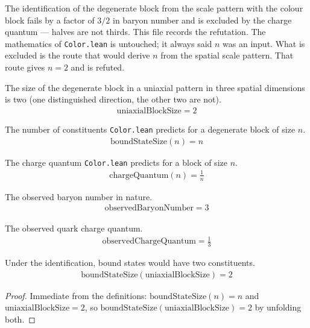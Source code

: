 The identification of the degenerate block from the scale pattern with the colour block fails by a factor of $3/2$ in baryon number and is excluded by the charge quantum — halves are not thirds.  This file records the refutation.  The mathematics of \texttt{Color.lean} is untouched; it always said $n$ was an input.  What is excluded is the route that would derive $n$ from the spatial scale pattern.  That route gives $n = 2$ and is refuted.

\begin{definition}
The size of the degenerate block in a uniaxial pattern in three spatial dimensions is two (one distinguished direction, the other two are not).
\begin{align*}
\text{uniaxialBlockSize} = 2
\end{align*}
\end{definition}

\begin{definition}
The number of constituents \texttt{Color.lean} predicts for a degenerate block of size $n$.
\begin{align*}
\text{boundStateSize}(n) = n
\end{align*}
\end{definition}

\begin{definition}
The charge quantum \texttt{Color.lean} predicts for a block of size $n$.
\begin{align*}
\text{chargeQuantum}(n) = \frac{1}{n}
\end{align*}
\end{definition}

\begin{definition}
The observed baryon number in nature.
\begin{align*}
\text{observedBaryonNumber} = 3
\end{align*}
\end{definition}

\begin{definition}
The observed quark charge quantum.
\begin{align*}
\text{observedChargeQuantum} = \frac{1}{3}
\end{align*}
\end{definition}

\begin{theorem}
Under the identification, bound states would have two constituents.
\begin{align*}
\text{boundStateSize}(\text{uniaxialBlockSize}) = 2
\end{align*}
\begin{proof}
Immediate from the definitions: $\text{boundStateSize}(n)=n$ and $\text{uniaxialBlockSize}=2$, so $\text{boundStateSize}(\text{uniaxialBlockSize})=2$ by unfolding both.
\end{proof}
\end{theorem}

